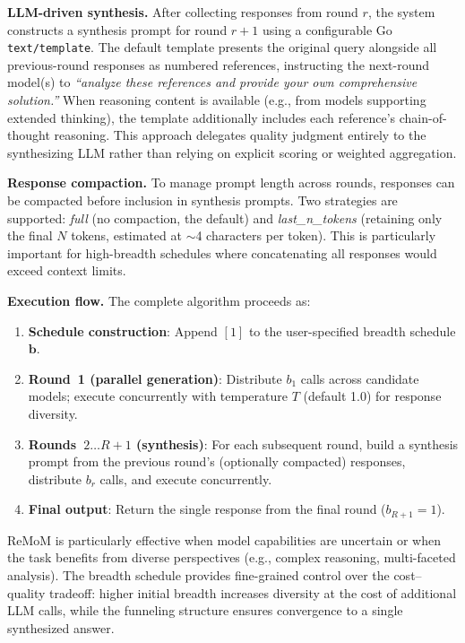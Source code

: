 \noindent\textbf{LLM-driven synthesis.}
After collecting responses from round $r$, the system constructs a synthesis prompt for round $r+1$ using a configurable Go \texttt{text/template}.
The default template presents the original query alongside all previous-round responses as numbered references, instructing the next-round model(s) to \emph{``analyze these references and provide your own comprehensive solution.''}
When reasoning content is available (e.g., from models supporting extended thinking), the template additionally includes each reference's chain-of-thought reasoning.
This approach delegates quality judgment entirely to the synthesizing LLM rather than relying on explicit scoring or weighted aggregation.

\noindent\textbf{Response compaction.}
To manage prompt length across rounds, responses can be compacted before inclusion in synthesis prompts.
Two strategies are supported: \emph{full} (no compaction, the default) and \emph{last\_n\_tokens} (retaining only the final $N$ tokens, estimated at $\sim$4 characters per token).
This is particularly important for high-breadth schedules where concatenating all responses would exceed context limits.

\noindent\textbf{Execution flow.}
The complete algorithm proceeds as:
\begin{enumerate}
  \item \textbf{Schedule construction}: Append $[1]$ to the user-specified breadth schedule $\mathbf{b}$.
  \item \textbf{Round~1 (parallel generation)}: Distribute $b_1$ calls across candidate models; execute concurrently with temperature $T$ (default 1.0) for response diversity.
  \item \textbf{Rounds~$2 \ldots R{+}1$ (synthesis)}: For each subsequent round, build a synthesis prompt from the previous round's (optionally compacted) responses, distribute $b_r$ calls, and execute concurrently.
  \item \textbf{Final output}: Return the single response from the final round ($b_{R+1} = 1$).
\end{enumerate}

ReMoM is particularly effective when model capabilities are uncertain or when the task benefits from diverse perspectives (e.g., complex reasoning, multi-faceted analysis).
The breadth schedule provides fine-grained control over the cost--quality tradeoff: higher initial breadth increases diversity at the cost of additional LLM calls, while the funneling structure ensures convergence to a single synthesized answer.

